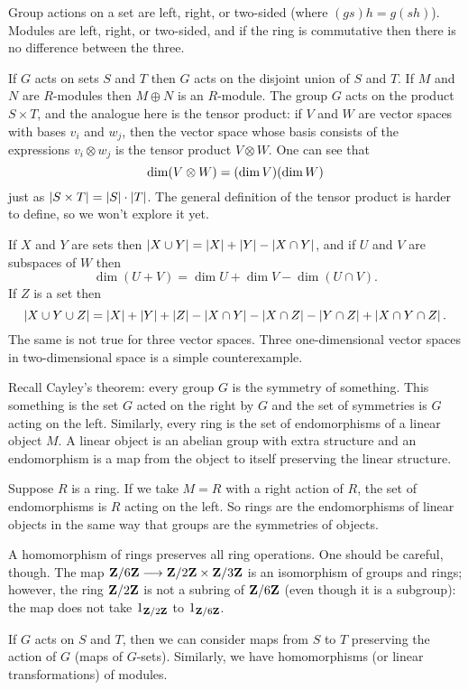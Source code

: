 \documentclass[11pt, oneside,margin=1in]{article}
\begin{document}
Group actions on a set are left, right, or two-sided (where $(gs)h = g(sh)$). Modules are left, right, or two-sided, and if the ring is commutative then there is no difference between the three. 

If $G$ acts on sets $S$ and $T$ then $G$ acts on the disjoint union of $S$ and $T$. If $M$ and $N$ are $R$-modules then $M\oplus N$ is an $R$-module. The group $G$ acts on the product $S\times T$, and the analogue here is the tensor product: if $V$ and $W$ are vector spaces with bases $v_i$ and $w_j$, then the vector space whose basis consists of the expressions $v_i\otimes w_j$ is the tensor product $V\otimes W$. One can see that 
$$
\dim(V\otimes W) = (\dim V)(\dim W)
$$
just as $\left \lvert S\times T \right \rvert = \left \lvert S \right \rvert \cdot \left \lvert T \right \rvert$. The general definition of the tensor product is harder to define, so we won't explore it yet.

If $X$ and $Y$ are sets then $\left \lvert X\cup Y \right \rvert = \left \lvert X \right \rvert + \left \lvert Y \right \rvert - \left \lvert X\cap Y \right \rvert$, and if $U$ and $V$ are subspaces of $W$ then $$\dim (U + V) = \dim U + \dim V - \dim(U\cap V).$$ If $Z$ is a set then 
$$
\left \lvert X\cup Y\cup Z \right \rvert = \left \lvert X \right \rvert +\left \lvert Y \right \rvert + \left \lvert Z \right \rvert - \left \lvert X \cap Y \right \rvert - \left \lvert X \cap Z \right \rvert - \left \lvert Y \cap Z \right \rvert  + \left \lvert X\cap Y\cap Z \right \rvert.
$$
The same is not true for three vector spaces. Three one-dimensional vector spaces in two-dimensional space is a simple counterexample.

Recall Cayley's theorem: every group $G$ is the symmetry of something. This something is the set $G$ acted on the right by $G$ and the set of symmetries is $G$ acting on the left. Similarly, every ring is the set of endomorphisms of a linear object $M$. A linear object is an abelian group with extra structure and an endomorphism is a map from the object to itself preserving the linear structure.

Suppose $R$ is a ring. If we take $M=R$ with a right action of $R$, the set of endomorphisms is $R$ acting on the left. So rings are the endomorphisms of linear objects in the same way that groups are the symmetries of objects.

A homomorphism of rings preserves all ring operations. One should be careful, though. The map $\mathbf Z / 6\mathbf Z \longrightarrow \mathbf Z / 2\mathbf Z \times \mathbf Z / 3\mathbf Z$ is an isomorphism of groups and rings; however, the ring $\mathbf Z / 2\mathbf Z$ is not a subring of $\mathbf Z / 6\mathbf Z$ (even though it is a subgroup): the map does not take $1_{\mathbf Z / 2\mathbf Z}$ to $1_{\mathbf Z / 6\mathbf Z}$.

If $G$ acts on $S$ and $T$, then we can consider maps from $S$ to $T$ preserving the action of $G$ (maps of $G$-sets). Similarly, we have homomorphisms (or linear transformations) of modules.
\end{document}
